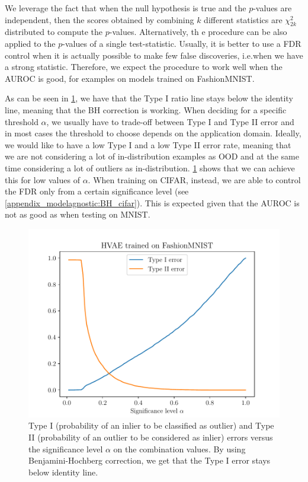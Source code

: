 {We leverage the fact that when the null hypothesis is true and the $p$-values are independent, then the scores obtained by combining $k$ different statistics are $\chi^2_{2k}$ distributed to compute the $p$-values. Alternatively, th e procedure can be also applied to the $p$-values of a single test-statistic.
%
Usually, it is better to use a FDR control when it is actually possible to make few false discoveries, i.e.\@ when we have a strong statistic. Therefore, we expect the procedure to work well when the AUROC is good, for examples on models trained on FashionMNIST.

As can be seen in \cref{fig_modelagnostic:type1}, we have that the Type I ratio line stays below the identity line, meaning that the BH correction is working. When deciding for a specific threshold $\alpha$, we usually have to trade-off between Type I and Type II error and in most cases the threshold to choose depends on the application domain. Ideally, we would like to have a low Type I and a low Type II error rate, meaning that we are not considering a lot of in-distribution examples as OOD and at the same time considering a lot of outliers as in-distribution. \cref{fig_modelagnostic:type1} shows that we can achieve this for low values of $\alpha$. When training on CIFAR, instead, we are able to control the FDR only from a certain significance level (see \cref{appendix_modelagnostic:BH_cifar}). This is expected given that the AUROC is not as good as when testing on MNIST.


\begin{figure}[tb]
    \centering
    \includegraphics[scale=0.48]{graphics/paper_modelagnostic/fashion_hvae_type1_correct_font.pdf}
    \caption[Type I and Type II errors versus the significance level $\alpha$ on the combination values]{Type I (probability of an inlier to be classified as outlier) and Type II (probability of an outlier to be considered as inlier) errors versus the significance level $\alpha$ on the combination values. By using Benjamini-Hochberg correction, we get that the Type I error stays below identity line.}
    \label{fig_modelagnostic:type1}
\end{figure}


}
